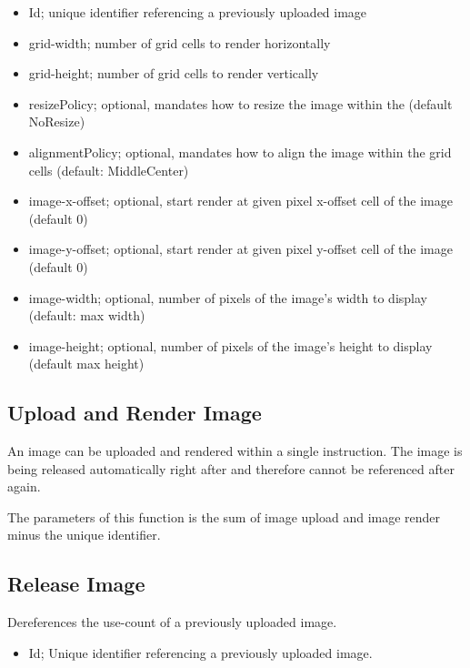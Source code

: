 \documentclass{article}
\begin{document}
\begin{itemize}
    \item Id; unique identifier referencing a previously uploaded image
    \item grid-width; number of grid cells to render horizontally
    \item grid-height; number of grid cells to render vertically
    \item resizePolicy; optional, mandates how to resize the image within the (default NoResize)
    \item alignmentPolicy; optional, mandates how to align the image within the grid cells (default: MiddleCenter)
    \item image-x-offset; optional, start render at given pixel x-offset cell of the image (default 0)
    \item image-y-offset; optional, start render at given pixel y-offset cell of the image (default 0)
    \item image-width; optional, number of pixels of the image's width to display (default: max width)
    \item image-height; optional, number of pixels of the image's height to display (default max height)
\end{itemize}

\subsection{Upload and Render Image}

An image can be uploaded and rendered within a single instruction.
The image is being released automatically right after and therefore cannot be referenced after
again.

The parameters of this function is the sum of image upload and image render minus the unique
identifier.

\subsection{Release Image}

Dereferences the use-count of a previously uploaded image.

\begin{itemize}
    \item Id; Unique identifier referencing a previously uploaded image.
\end{itemize}
\end{document}
